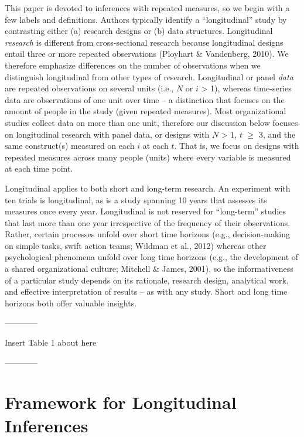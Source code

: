 \documentclass[english,,man]{apa6}
\begin{document}
This paper is devoted to inferences with repeated measures, so we begin with a few labels and definitions. Authors typically identify a \enquote{longitudinal} study by contrasting either (a) research designs or (b) data structures. Longitudinal \emph{research} is different from cross-sectional research because longitudinal designs entail three or more repeated observations (Ployhart \& Vandenberg, 2010). We therefore emphasize differences on the number of observations when we distinguish longitudinal from other types of research. Longitudinal or panel \emph{data} are repeated observations on several units (i.e., \(N\) or \(i\) \textgreater{} 1), whereas time-series data are observations of one unit over time -- a distinction that focuses on the amount of people in the study (given repeated measures). Most organizational studies collect data on more than one unit, therefore our discussion below focuses on longitudinal research with panel data, or designs with \(N\) \textgreater{} 1, \(t\) \(\geq\) 3, and the same construct(s) measured on each \(i\) at each \(t\). That is, we focus on designs with repeated measures across many people (units) where every variable is measured at each time point.

Longitudinal applies to both short and long-term research. An experiment with ten trials is longitudinal, as is a study spanning 10 years that assesses its measures once every year. Longitudinal is not reserved for \enquote{long-term} studies that last more than one year irrespective of the frequency of their observations. Rather, certain processes unfold over short time horizons (e.g., decision-making on simple tasks, swift action teams; Wildman et al., 2012) whereas other psychological phenomena unfold over long time horizons (e.g., the development of a shared organizational culture; Mitchell \& James, 2001), so the informativeness of a particular study depends on its rationale, research design, analytical work, and effective interpretation of results -- as with any study. Short and long time horizons both offer valuable insights.

\begin{center}

------------

Insert Table 1 about here

------------

\end{center}

\hypertarget{framework-for-longitudinal-inferences}{%
\section{Framework for Longitudinal Inferences}\label{framework-for-longitudinal-inferences}}
\end{document}
